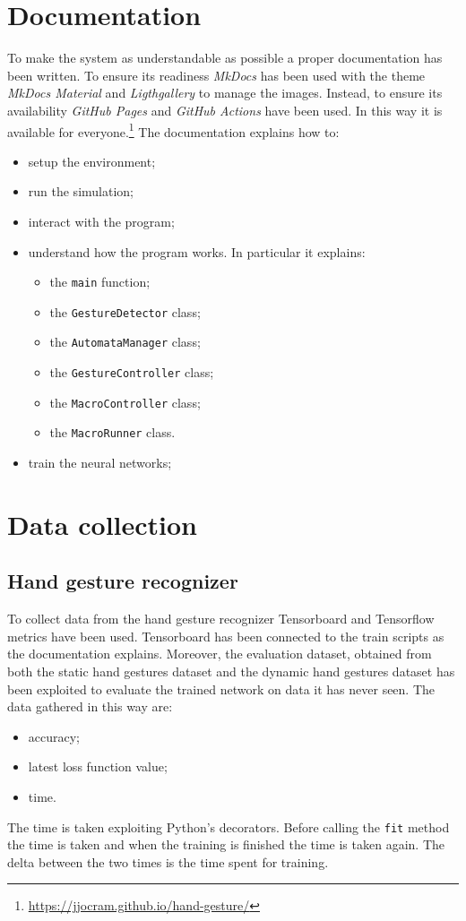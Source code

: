 \documentclass[../thesis.tex]{subfiles}
\begin{document}
\section{Documentation}
To make the system as understandable as possible a proper documentation has been written. To ensure its readiness \textit{MkDocs} has been used with the theme \textit{MkDocs Material} and \textit{Ligthgallery} to manage the images. Instead, to ensure its availability \textit{GitHub Pages} and \textit{GitHub Actions} have been used. In this way it is available for everyone.\footnote{\href{https://jjocram.github.io/hand-gesture/}{https://jjocram.github.io/hand-gesture/}} The documentation explains how to:
\begin{itemize}
    \item setup the environment;
    \item run the simulation;
    \item interact with the program;
    \item understand how the program works. In particular it explains:
    \begin{itemize}
        \item the \texttt{main} function;
        \item the \texttt{GestureDetector} class;
        \item the \texttt{AutomataManager} class;
        \item the \texttt{GestureController} class;
        \item the \texttt{MacroController} class;
        \item the \texttt{MacroRunner} class.
    \end{itemize}
    \item train the neural networks;
\end{itemize}

\section{Data collection}
\subsection{Hand gesture recognizer}
To collect data from the hand gesture recognizer Tensorboard and Tensorflow metrics have been used. Tensorboard has been connected to the train scripts as the documentation explains. Moreover, the evaluation dataset, obtained from both the static hand gestures dataset and the dynamic hand gestures dataset has been exploited to evaluate the trained network on data it has never seen. The data gathered in this way are:
\begin{itemize}
    \item accuracy;
    \item latest loss function value;
    \item time.
\end{itemize}
The time is taken exploiting Python's decorators. Before calling the \texttt{fit} method the time is taken and when the training is finished the time is taken again. The delta between the two times is the time spent for training.
\end{document}
